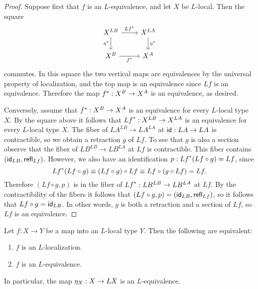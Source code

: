 \begin{proof} 
Suppose first that $f$ is an $L$-equivalence, and let $X$ be $L$-local. Then the square
\begin{equation*}
\begin{tikzcd}
X^{LB} \arrow[r,"\precomp{Lf}"] \arrow[d,swap,"\precomp{\eta}"] & X^{LA} \arrow[d,"\precomp{\eta}"] \\
X^{B} \arrow[r,swap,"\precomp{f}"] & X^{A}
\end{tikzcd}
\end{equation*}
commutes. In this square the two vertical maps are equivalences by the universal property of localization, and the top map is an equivalence since $L f$ is an equivalence. Therefore the map $\precomp{f}:X^B\to X^A$ is an equivalence, as desired.

Conversely, assume that $\precomp{f} : X^B \to X^A$ is an equivalence for every $L$-local type $X$. By the square above it follows that $\precomp{L f}:X^{L B}\to X^{L A}$ is an equivalence for every $L$-local type $X$. The fiber of $L A^{L B}\to L A^{L A}$ at $\idfunc:L A\to L A$ is contractible, so we obtain a retraction $g$ of $L f$. To see that $g$ is also a section observe that the fiber of $L B^{L B}\to L B^{L A}$ at $L f$ is contractible. This fiber contains $(\idfunc[L B],\refl{L f})$. However, we also have an identification $p:\precomp{L f}(L f\circ g)=L f$, since
\begin{equation*}
\precomp{L f}(L f\circ g)\jdeq (L f \circ g)\circ L f\jdeq L f \circ (g\circ L f) = L f. 
\end{equation*}
Therefore $(L f\circ g,p)$ is in the fiber of $\precomp{L f}:L B^{L B}\to L B^{L A}$ at $L f$. By the contractibility of the fibers it follows that $(L f\circ g,p)=(\idfunc[L B],\refl{L f})$, so it follows that $L f\circ g=\idfunc[L B]$. In other words, $g$ is both a retraction and a section of $L f$, so $L f$ is an equivalence.
\end{proof}

\begin{cor}\label{cor:localization_lequiv}
Let $f:X\to Y$ be a map into an $L$-local type $Y$. Then the following are equivalent:
\begin{enumerate}
\item $f$ is an $L$-localization.
\item $f$ is an $L$-equivalence.
\end{enumerate}
In particular, the map $\modalunit[X]:X\to LX$ is an $L$-equivalence.
\end{cor}

